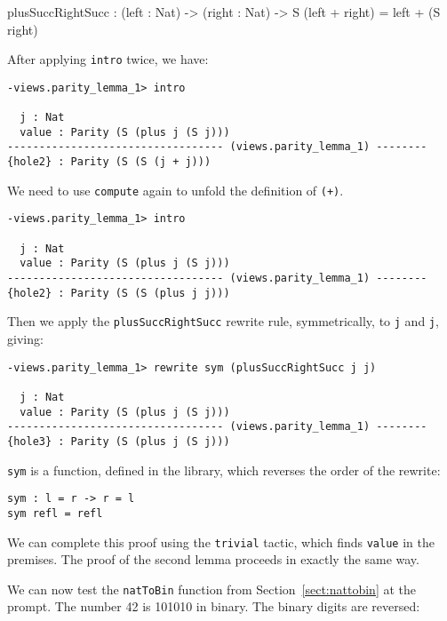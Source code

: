 \begin{code}
plusSuccRightSucc : (left : Nat) -> (right : Nat) ->
  S (left + right) = left + (S right)
\end{code}

\noindent
After applying \texttt{intro} twice, we have:

\begin{lstlisting}[style=stdout]
-views.parity_lemma_1> intro 

  j : Nat
  value : Parity (S (plus j (S j)))
---------------------------------- (views.parity_lemma_1) --------
{hole2} : Parity (S (S (j + j)))
\end{lstlisting}

\noindent
We need to use \texttt{compute} again to unfold the definition of \texttt{(+)}.

\begin{lstlisting}[style=stdout]
-views.parity_lemma_1> intro 

  j : Nat
  value : Parity (S (plus j (S j)))
---------------------------------- (views.parity_lemma_1) --------
{hole2} : Parity (S (S (plus j j)))
\end{lstlisting}

\noindent
Then we apply the \texttt{plusSuccRightSucc} rewrite rule, symmetrically, to \texttt{j} and \texttt{j}, giving:

\begin{lstlisting}[style=stdout]
-views.parity_lemma_1> rewrite sym (plusSuccRightSucc j j) 
 
  j : Nat
  value : Parity (S (plus j (S j)))
---------------------------------- (views.parity_lemma_1) --------
{hole3} : Parity (S (plus j (S j)))
\end{lstlisting}

\noindent
\texttt{sym} is a function, defined in the library, which reverses the order of the rewrite:

\begin{lstlisting}[style=stdout]
sym : l = r -> r = l
sym refl = refl
\end{lstlisting} 

\noindent
We can complete this proof using the \texttt{trivial} tactic, which finds  \texttt{value} in the premises.
The proof of the second lemma proceeds in exactly the same way.

We can now test the \texttt{natToBin} function from Section~\ref{sect:nattobin} at the prompt.
The number 42 is 101010 in binary.
The binary digits are reversed:

